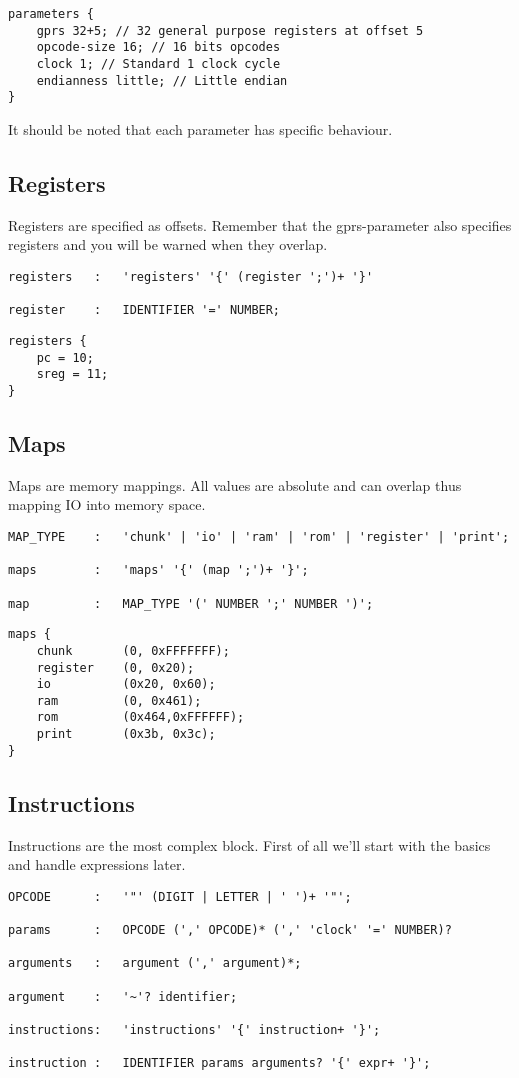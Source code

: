 \lstset{caption=Example parameters}
\begin{lstlisting}
parameters {
	gprs 32+5; // 32 general purpose registers at offset 5
	opcode-size 16; // 16 bits opcodes
	clock 1; // Standard 1 clock cycle
	endianness little; // Little endian
}
\end{lstlisting}

It should be noted that each parameter has specific behaviour.

\subsection{Registers}
Registers are specified as offsets. Remember that the gprs-parameter also
specifies registers and you will be warned when they overlap.
\lstset{caption=Register specification}
\begin{lstlisting}
registers	:	'registers' '{' (register ';')+ '}'

register	:	IDENTIFIER '=' NUMBER;
\end{lstlisting}

\lstset{caption=Example register specification}
\begin{lstlisting}
registers {
	pc = 10;
	sreg = 11;
}
\end{lstlisting}

\subsection{Maps}
Maps are memory mappings. All values are absolute and can overlap thus mapping
IO into memory space.
\lstset{caption=Memory mapping specification}
\begin{lstlisting}
MAP_TYPE	:	'chunk' | 'io' | 'ram' | 'rom' | 'register' | 'print';

maps		:	'maps' '{' (map ';')+ '}';

map			:	MAP_TYPE '(' NUMBER ';' NUMBER ')';
\end{lstlisting}

\lstset{caption=Example memory mapping}
\begin{lstlisting}
maps {
	chunk		(0, 0xFFFFFFF);
	register	(0, 0x20);
	io			(0x20, 0x60);
	ram			(0, 0x461);
	rom			(0x464,0xFFFFFF);
	print		(0x3b, 0x3c);
}
\end{lstlisting}

\subsection{Instructions}
Instructions are the most complex block. First of all we'll start with the
basics and handle expressions later.
\lstset{caption=Instruction specification}
\begin{lstlisting}
OPCODE		:	'"' (DIGIT | LETTER | ' ')+ '"';

params		:	OPCODE (',' OPCODE)* (',' 'clock' '=' NUMBER)?

arguments	:	argument (',' argument)*;

argument	:	'~'? identifier;

instructions:	'instructions' '{' instruction+ '}';

instruction	:	IDENTIFIER params arguments? '{' expr+ '}';
\end{lstlisting}

